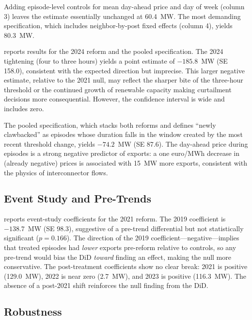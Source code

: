 \documentclass[12pt]{article}
\begin{document}
Adding episode-level controls for mean day-ahead price and day of week (column 3) leaves the estimate essentially unchanged at 60.4~MW. The most demanding specification, which includes neighbor-by-post fixed effects (column 4), yields 80.3~MW.



 reports results for the 2024 reform and the pooled specification. The 2024 tightening (four to three hours) yields a point estimate of $-185.8$~MW (SE 158.0), consistent with the expected direction but imprecise. This larger negative estimate, relative to the 2021 null, may reflect the sharper bite of the three-hour threshold or the continued growth of renewable capacity making curtailment decisions more consequential. However, the confidence interval is wide and includes zero.

The pooled specification, which stacks both reforms and defines ``newly clawbacked'' as episodes whose duration falls in the window created by the most recent threshold change, yields $-74.2$~MW (SE 87.6). The day-ahead price during episodes is a strong negative predictor of exports: a one euro/MWh decrease in (already negative) prices is associated with 15~MW more exports, consistent with the physics of interconnector flows.

\subsection{Event Study and Pre-Trends}



 reports event-study coefficients for the 2021 reform. The 2019 coefficient is $-138.7$~MW (SE 98.3), suggestive of a pre-trend differential but not statistically significant ($p = 0.166$). The direction of the 2019 coefficient---negative---implies that treated episodes had \textit{lower} exports pre-reform relative to controls, so any pre-trend would bias the DiD \textit{toward} finding an effect, making the null more conservative. The post-treatment coefficients show no clear break: 2021 is positive (129.0~MW), 2022 is near zero (2.7~MW), and 2023 is positive (116.3~MW). The absence of a post-2021 shift reinforces the null finding from the DiD.

\subsection{Robustness}
\end{document}
